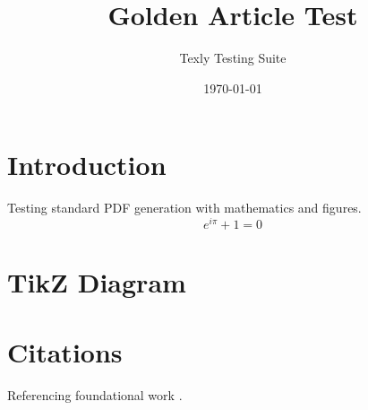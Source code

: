\documentclass{article}
\title{Golden Article Test}
\author{Texly Testing Suite}
\date{\today}
\begin{document}
\maketitle

\section{Introduction}
Testing standard PDF generation with mathematics and figures.
\begin{equation}
e^{i\pi} + 1 = 0
\end{equation}

\section{TikZ Diagram}

\section{Citations}
Referencing foundational work \cite{knuth1984}.



\end{document}
